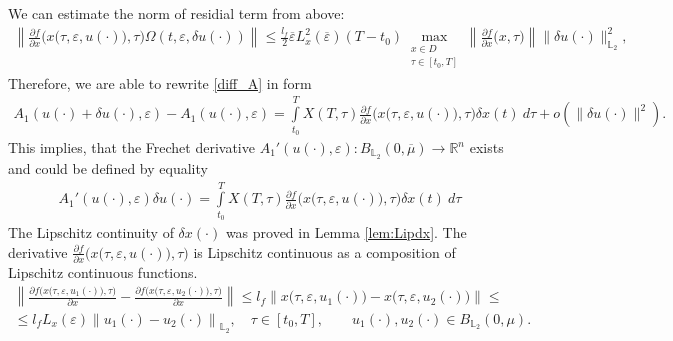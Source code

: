 \documentclass[../main.tex]{subfiles}
\begin{document}
We can estimate the norm of residial term from above:
\begin{gather*}
	\left\| 
	\frac{\partial f}{\partial x} \Big(x\big(\tau,\varepsilon, u(\cdot)\big), \tau\Big) \Omega(t,\varepsilon, \delta u(\cdot)) 
	\right\| 
	\leqslant
	\frac{l_f}{2}
	\overline{\varepsilon} 
	L_x^2(\overline{\varepsilon})
	(T-t_0)
	\max_{\substack{x\in D \\ \tau \in [t_0,T]}} 
	\left\|\frac{\partial f}{\partial x} \Big(x, \tau\Big) \right\|
	\|\delta u(\cdot)\|_{\mathbb{L}_2}^2,
\end{gather*}
Therefore, we are able to rewrite \eqref{diff_A} in form
\begin{gather}
	A_1(u(\cdot) + \delta u(\cdot),\varepsilon) - A_1(u(\cdot) ,\varepsilon) = \int\limits_{t_0}^T X(T,\tau) \frac{\partial f}{\partial x}  \Big(x\big(\tau,\varepsilon, u(\cdot)\big), \tau\Big) \delta x(t) \ d\tau + o(\|\delta u(\cdot)\|^2).
\end{gather}
This implies, that the Frechet derivative  $A_1'(u(\cdot),\varepsilon): B_{\mathbb{L}_2}(0,\overline{\mu}) \to \mathbb{R}^n $ exists and could be defined by equality
\begin{gather}\label{A1_diff}
	A_1'(u(\cdot),\varepsilon)\delta u(\cdot) = \int\limits_{t_0}^T X(T,\tau) \frac{\partial f}{\partial x}  \Big(x\big(\tau,\varepsilon, u(\cdot)\big), \tau\Big) \delta x(t) \ d\tau 
\end{gather}
The Lipschitz continuity of $\delta x(\cdot)$ was proved in Lemma \ref{lem:Lipdx}. The derivative $\frac{\partial f}{\partial x} \Big(x\big(\tau,\varepsilon, u(\cdot)\big),\tau\Big)$ is Lipschitz continuous as a composition of Lipschitz continuous functions.
\begin{gather*}
	\left\| \frac{\partial f \Big(x\big(\tau,\varepsilon, u_1(\cdot)\big),\tau\Big)} {\partial x} - \frac{\partial f \Big(x\big(\tau,\varepsilon, u_2(\cdot)\big),\tau\Big)} {\partial x} \right\| \leqslant l_f \left\|x\big(\tau,\varepsilon, u_1(\cdot) \big) - x\big(\tau,\varepsilon, u_2(\cdot)\big) \right\| \leqslant \\ \leqslant l_f L_x(\varepsilon) \left\| u_1(\cdot) - u_2(\cdot) \right\|_{\mathbb{L}_2}, \quad \tau \in [t_0, T], \qquad u_1(\cdot), u_2(\cdot) \in B_{\mathbb{L}_2}(0,\mu).
\end{gather*}
\end{document}
